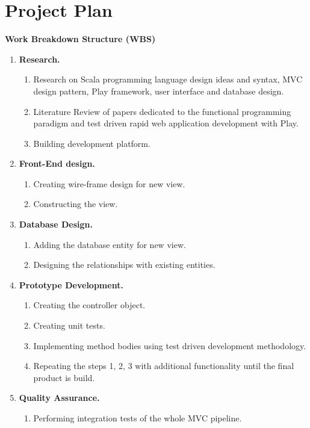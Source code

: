 \documentclass[12pt,twoside,a4paper]{report}
\begin{document}
\section{Project Plan}\label{1.7}
\textbf{Work Breakdown Structure (WBS)}
\begin{enumerate}\itemsep1pt \parskip0pt 
\item \textbf{Research.}
	\begin{enumerate}\itemsep1pt \parskip0pt 
	\item Research on Scala programming language design ideas and syntax, MVC design pattern, Play framework, user interface and database design.
	\item Literature Review of papers dedicated to the functional programming paradigm and test driven rapid web application development with Play.
	\item Building development platform.
	\end{enumerate}
\item \textbf{Front-End design.}
	\begin{enumerate}\itemsep1pt \parskip0pt 
	\item Creating wire-frame design for new view.
	\item Constructing the view.
	\end{enumerate}
\item \textbf{Database Design.}
	\begin{enumerate}\itemsep1pt \parskip0pt 
	\item Adding the database entity for new view.
	\item Designing the relationships with existing entities.
	\end{enumerate}
\item \textbf{Prototype Development.}
	\begin{enumerate}\itemsep1pt \parskip0pt 
	\item Creating the controller object.
	\item Creating unit tests.
	\item Implementing method bodies using test driven development methodology.
	\item Repeating the steps 1, 2, 3 with additional functionality until the final product is build.
	\end{enumerate}
\item \textbf{Quality Assurance.}
	\begin{enumerate}\itemsep1pt \parskip0pt 
	\item Performing integration tests of the whole MVC pipeline.

\end{enumerate}
\end{enumerate}
\end{document}
